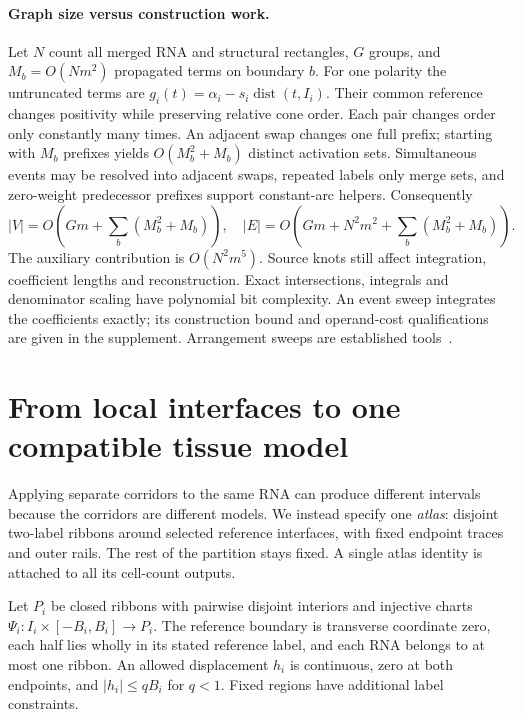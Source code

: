 \documentclass[10pt,letterpaper]{article}
\newcommand{\dist}{\operatorname{dist}}
\begin{document}
\paragraph{Graph size versus construction work.}
Let $N$ count all merged RNA and structural rectangles, $G$ groups, and $M_b=O(Nm^2)$ propagated terms on boundary $b$. For one polarity the untruncated terms are $g_i(t)=\alpha_i-s_i\dist(t,I_i)$. Their common reference changes positivity while preserving relative cone order. Each pair changes order only constantly many times. An adjacent swap changes one full prefix; starting with $M_b$ prefixes yields $O(M_b^2+M_b)$ distinct activation sets. Simultaneous events may be resolved into adjacent swaps, repeated labels only merge sets, and zero-weight predecessor prefixes support constant-arc helpers. Consequently
\begin{equation}
|V|=O\!\left(Gm+\sum_b(M_b^2+M_b)\right),\quad
|E|=O\!\left(Gm+N^2m^2+\sum_b(M_b^2+M_b)\right).\label{eq:size}
\end{equation}
The auxiliary contribution is $O(N^2m^5)$. Source knots still affect integration, coefficient lengths and reconstruction. Exact intersections, integrals and denominator scaling have polynomial bit complexity. An event sweep integrates the coefficients exactly; its construction bound and operand-cost qualifications are given in the supplement. Arrangement sweeps are established tools~\cite{bentley}.

\section{From local interfaces to one compatible tissue model}\label{sec:atlas}
Applying separate corridors to the same RNA can produce different intervals because the corridors are different models. We instead specify one \emph{atlas}: disjoint two-label ribbons around selected reference interfaces, with fixed endpoint traces and outer rails. The rest of the partition stays fixed. A single atlas identity is attached to all its cell-count outputs.

Let $P_i$ be closed ribbons with pairwise disjoint interiors and injective charts $\Psi_i:I_i\times[-B_i,B_i]\to P_i$. The reference boundary is transverse coordinate zero, each half lies wholly in its stated reference label, and each RNA belongs to at most one ribbon. An allowed displacement $h_i$ is continuous, zero at both endpoints, and $|h_i|\le qB_i$ for $q<1$. Fixed regions have additional label constraints.
\end{document}
